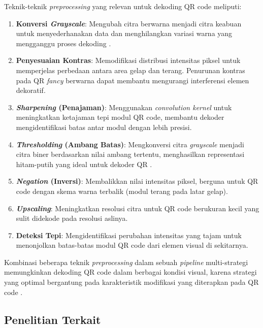 \documentclass[conference]{IEEEtran}
\begin{document}
Teknik-teknik \textit{preprocessing} yang relevan untuk dekoding QR code meliputi:

\begin{enumerate}[label=\arabic*)]
    \item \textbf{Konversi \textit{Grayscale}}: Mengubah citra berwarna menjadi citra keabuan untuk menyederhanakan data dan menghilangkan variasi warna yang mengganggu proses dekoding \cite{gonzalez_digital_2018}.
    
    \item \textbf{Penyesuaian Kontras}: Memodifikasi distribusi intensitas piksel untuk memperjelas perbedaan antara area gelap dan terang. Penurunan kontras pada QR \textit{fancy} berwarna dapat membantu mengurangi interferensi elemen dekoratif.
    
    \item \textbf{\textit{Sharpening} (Penajaman)}: Menggunakan \textit{convolution kernel} untuk meningkatkan ketajaman tepi modul QR code, membantu dekoder mengidentifikasi batas antar modul dengan lebih presisi.
    
    \item \textbf{\textit{Thresholding} (Ambang Batas)}: Mengkonversi citra \textit{grayscale} menjadi citra biner berdasarkan nilai ambang tertentu, menghasilkan representasi hitam-putih yang ideal untuk dekoder QR \cite{otsu_threshold_1979}.
    
    \item \textbf{\textit{Negation} (Inversi)}: Membalikkan nilai intensitas piksel, berguna untuk QR code dengan skema warna terbalik (modul terang pada latar gelap).
    
    \item \textbf{\textit{Upscaling}}: Meningkatkan resolusi citra untuk QR code berukuran kecil yang sulit didekode pada resolusi aslinya.
    
    \item \textbf{Deteksi Tepi}: Mengidentifikasi perubahan intensitas yang tajam untuk menonjolkan batas-batas modul QR code dari elemen visual di sekitarnya.
\end{enumerate}

Kombinasi beberapa teknik \textit{preprocessing} dalam sebuah \textit{pipeline} multi-strategi memungkinkan dekoding QR code dalam berbagai kondisi visual, karena strategi yang optimal bergantung pada karakteristik modifikasi yang diterapkan pada QR code \cite{liu_recognition_2019}.

\subsection{Penelitian Terkait}
\end{document}
